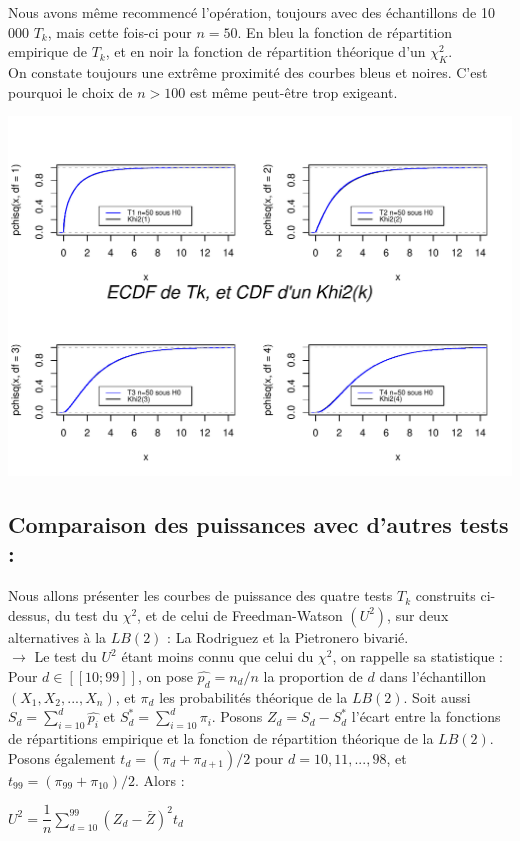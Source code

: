 \documentclass[12pt,a4paper]{article}
\begin{document}
Nous avons même recommencé l'opération, toujours avec des échantillons de 10 000 $T_{k}$, mais cette fois-ci pour $n=50$. En bleu la fonction de répartition empirique de $T_{k}$, et en noir la fonction de répartition théorique d'un $\chi_{K}^{2}$. \\

On constate toujours une extrême proximité des courbes bleus et noires. C'est pourquoi le choix de $n > 100$ est même peut-être trop exigeant.


\begin{center}
\includegraphics[scale=0.9]{ECDF5.pdf}
\end{center}


\subsection{Comparaison des puissances avec d'autres tests : \\}


Nous allons présenter les courbes de puissance des quatre tests $T_{k}$ construits ci-dessus, du test du $\chi^{2}$, et de celui de Freedman-Watson $(U^{2})$, sur deux alternatives à la $LB(2)$ : La Rodriguez et la Pietronero bivarié. \\
	
$\rightarrow$ Le test du $U^{2}$ étant moins connu que celui du $\chi^{2}$, on rappelle sa statistique : \\

Pour $d \in [\![ 10; 99 ]\!]$, on pose $\hat{p_{d}} = n_{d}/n$ la proportion de $d$ dans l'échantillon $(X_{1}, X_{2}, ...,X_{n})$, et $\pi_{d}$ les probabilités théorique de la $LB(2)$. Soit aussi $S_{d} = \sum \limits_{i=10}^{d} \hat{p_{i}}$ et $S_{d}^{*} = \sum \limits_{i=10}^{d}  \pi_{i}$. Posons $Z_{d} = S_{d} - S_{d}^{*}$ l'écart entre la fonctions de répartitions empirique et la fonction de répartition théorique de la $LB(2)$. Posons également $t_{d} = (\pi_{d} + \pi_{d+1})/2$ pour $d=10,11,...,98$, et $t_{99} = (\pi_{99} + \pi_{10})/2$. Alors :
\begin{center}
$U^{2} = \dfrac{1}{n} \sum \limits_{d=10}^{99} (Z_{d} - \bar{Z})^{2} t_{d}$
\end{center}
\end{document}
